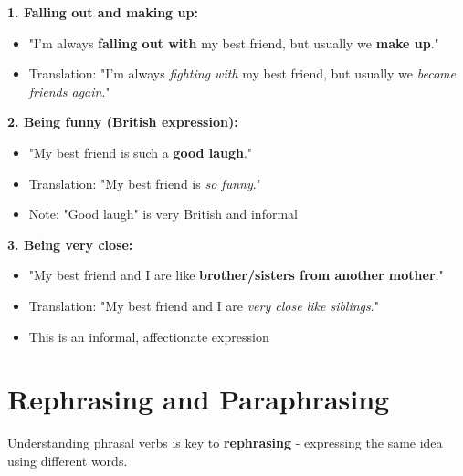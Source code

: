 \begin{tcolorbox}[colback=blue!5, colframe=blue!30, title=Idiomatic Expressions with Phrasal Verbs]
\textbf{1. Falling out and making up:}
\begin{itemize}
    \item "I'm always \textbf{falling out with} my best friend, but usually we \textbf{make up}."
    \item Translation: "I'm always \textit{fighting with} my best friend, but usually we \textit{become friends again}."
\end{itemize}

\textbf{2. Being funny (British expression):}
\begin{itemize}
    \item "My best friend is such a \textbf{good laugh}."
    \item Translation: "My best friend is \textit{so funny}."
    \item Note: "Good laugh" is very British and informal
\end{itemize}

\textbf{3. Being very close:}
\begin{itemize}
    \item "My best friend and I are like \textbf{brother/sisters from another mother}."
    \item Translation: "My best friend and I are \textit{very close like siblings}."
    \item This is an informal, affectionate expression
\end{itemize}
\end{tcolorbox}

\section{Rephrasing and Paraphrasing}

Understanding phrasal verbs is key to \textbf{rephrasing} - expressing the same idea using different words.

